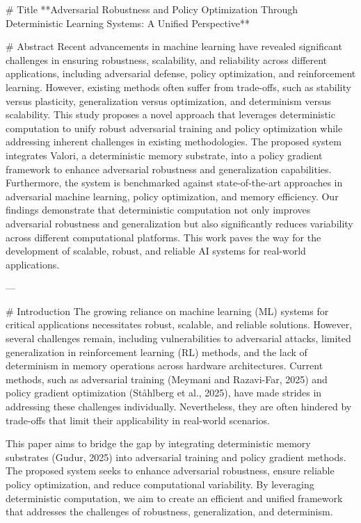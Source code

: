 # Title  
**Adversarial Robustness and Policy Optimization Through Deterministic Learning Systems: A Unified Perspective**

# Abstract  
Recent advancements in machine learning have revealed significant challenges in ensuring robustness, scalability, and reliability across different applications, including adversarial defense, policy optimization, and reinforcement learning. However, existing methods often suffer from trade-offs, such as stability versus plasticity, generalization versus optimization, and determinism versus scalability. This study proposes a novel approach that leverages deterministic computation to unify robust adversarial training and policy optimization while addressing inherent challenges in existing methodologies. The proposed system integrates Valori, a deterministic memory substrate, into a policy gradient framework to enhance adversarial robustness and generalization capabilities. Furthermore, the system is benchmarked against state-of-the-art approaches in adversarial machine learning, policy optimization, and memory efficiency. Our findings demonstrate that deterministic computation not only improves adversarial robustness and generalization but also significantly reduces variability across different computational platforms. This work paves the way for the development of scalable, robust, and reliable AI systems for real-world applications.

---

# Introduction  
The growing reliance on machine learning (ML) systems for critical applications necessitates robust, scalable, and reliable solutions. However, several challenges remain, including vulnerabilities to adversarial attacks, limited generalization in reinforcement learning (RL) methods, and the lack of determinism in memory operations across hardware architectures. Current methods, such as adversarial training (Meymani and Razavi-Far, 2025) and policy gradient optimization (Ståhlberg et al., 2025), have made strides in addressing these challenges individually. Nevertheless, they are often hindered by trade-offs that limit their applicability in real-world scenarios.

This paper aims to bridge the gap by integrating deterministic memory substrates (Gudur, 2025) into adversarial training and policy gradient methods. The proposed system seeks to enhance adversarial robustness, ensure reliable policy optimization, and reduce computational variability. By leveraging deterministic computation, we aim to create an efficient and unified framework that addresses the challenges of robustness, generalization, and determinism.

